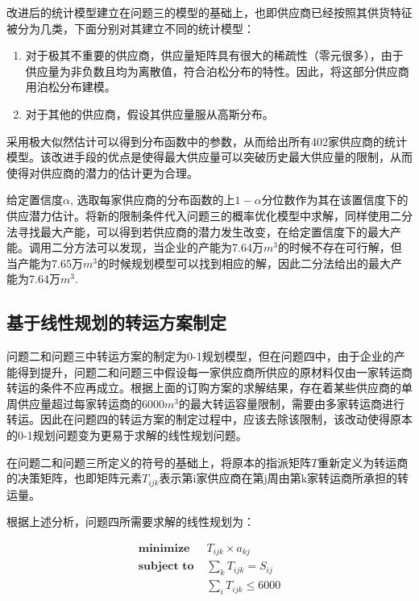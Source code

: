 \documentclass{my_paper}
\begin{document}
改进后的统计模型建立在问题三的模型的基础上，也即供应商已经按照其供货特征被分为几类，下面分别对其建立不同的统计模型：

\begin{enumerate}

\item 对于极其不重要的供应商，供应量矩阵具有很大的稀疏性（零元很多），由于供应量为非负数且均为离散值，符合泊松分布的特性。因此，将这部分供应商用泊松分布建模。

\item 对于其他的供应商，假设其供应量服从高斯分布。

\end{enumerate}

采用极大似然估计可以得到分布函数中的参数，从而给出所有402家供应商的统计模型。该改进手段的优点是使得最大供应量可以突破历史最大供应量的限制，从而使得对供应商的潜力的估计更为合理。

给定置信度$\alpha$, 选取每家供应商的分布函数的上$1-\alpha$分位数作为其在该置信度下的供应潜力估计。将新的限制条件代入问题三的概率优化模型中求解，同样使用二分法寻找最大产能，可以得到若供应商的潜力发生改变，在给定置信度下的最大产能。调用二分方法可以发现，当企业的产能为7.64万$m^3$的时候不存在可行解，但当产能为7.65万$m^3$的时候规划模型可以找到相应的解，因此二分法给出的最大产能为7.64万$m^3$. 

\subsection{基于线性规划的转运方案制定}

问题二和问题三中转运方案的制定为0-1规划模型，但在问题四中，由于企业的产能得到提升，问题二和问题三中假设每一家供应商所供应的原材料仅由一家转运商转运的条件不应再成立。根据上面的订购方案的求解结果，存在着某些供应商的单周供应量超过每家转运商的6000$m^3$的最大转运容量限制，需要由多家转运商进行转运。因此在问题四的转运方案的制定过程中，应该去除该限制，该改动使得原本的0-1规划问题变为更易于求解的线性规划问题。

在问题二和问题三所定义的符号的基础上，将原本的指派矩阵$T$重新定义为转运商的决策矩阵，也即矩阵元素$T_{ijk}$表示第i家供应商在第j周由第k家转运商所承担的转运量。

根据上述分析，问题四所需要求解的线性规划为：

\begin{align*} 
\textbf{minimize } & T_{ijk} \times a_{kj} \\
\textbf{subject to } &  \sum_{k} T_{ijk} = S_{ij} \\
& \sum_{i} T_{ijk} \le 6000 \\
\end{align*}
\end{document}
